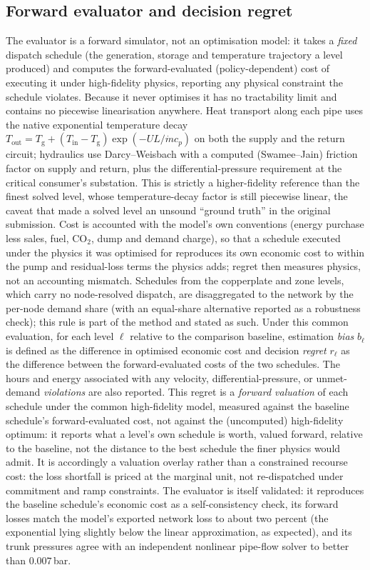 \documentclass[a4paper,fleqn]{cas-sc}
\begin{document}
\subsection{Forward evaluator and decision regret}
\label{subsec:evaluator}
The evaluator is a forward simulator, not an optimisation model: it takes a \emph{fixed}
dispatch schedule (the generation, storage and temperature trajectory a level produced)
and computes the forward-evaluated (policy-dependent) cost of executing it under high-fidelity
physics, reporting any physical
constraint the schedule violates. Because it never optimises it has no tractability limit and
contains no piecewise linearisation anywhere. Heat transport along each pipe uses the native
exponential temperature decay $T_\text{out}=T_\text{g}+(T_\text{in}-T_\text{g})\exp(-U L/\dot m
c_p)$ on both the supply and the return circuit; hydraulics use Darcy--Weisbach with a
computed (Swamee--Jain) friction factor on supply and return, plus the differential-pressure
requirement at the critical consumer's substation. This is strictly a higher-fidelity
reference than the finest solved level, whose temperature-decay factor is still piecewise
linear, the caveat that made a solved level an unsound ``ground truth'' in the original
submission. Cost is accounted with the model's own conventions (energy purchase less sales,
fuel, CO$_2$, dump and demand charge), so that a schedule executed under the physics it was
optimised for reproduces its own economic cost to within the pump and residual-loss terms
the physics adds; regret then measures physics, not an accounting mismatch. Schedules from the
copperplate and zone levels, which carry no node-resolved dispatch, are disaggregated to the
network by the per-node demand share (with an equal-share alternative reported as a
robustness check); this rule is part of the method and stated as such. Under this common evaluation, for each level \(\ell\) relative to the comparison baseline,
estimation \emph{bias} \(b_\ell\) is defined as the difference in optimised economic cost and
decision \emph{regret} \(r_\ell\) as the difference between the forward-evaluated costs of the
two schedules.
The hours and energy associated with any velocity, differential-pressure, or unmet-demand
\emph{violations} are also reported. This regret is a \emph{forward valuation} of each
schedule under the common high-fidelity model, measured against the baseline schedule's
forward-evaluated cost, not against the (uncomputed) high-fidelity optimum: it reports what a
level's own schedule is worth, valued forward, relative to the baseline, not the distance to
the best schedule the finer physics would admit. It is accordingly a valuation overlay rather
than a constrained recourse cost: the loss shortfall is priced at the marginal unit, not
re-dispatched under commitment and ramp constraints. The evaluator
is itself validated: it reproduces the baseline schedule's economic cost as a self-consistency
check, its forward losses match the model's exported network loss to about two percent (the
exponential lying slightly below the linear approximation, as expected), and its trunk
pressures agree with an independent nonlinear pipe-flow solver to better than $0.007$\,bar.
\end{document}
